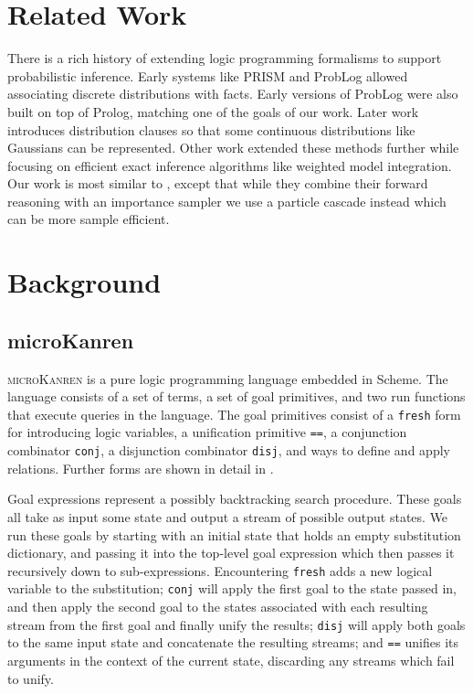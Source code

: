 \documentclass[
]{ceurart}
\begin{document}
\section{Related Work}

There is a rich history of extending logic programming formalisms to
support probabilistic inference. Early systems like
PRISM\cite{sato1997prism} and ProbLog\cite{de2007problog} allowed
associating discrete distributions with facts. Early versions of
ProbLog were also built on top of Prolog, matching one of the goals of
our work. Later work\cite{gutmann2010extending} introduces
distribution clauses so that some continuous distributions like
Gaussians can be represented. Other work extended these methods
further while focusing on efficient exact inference algorithms like
weighted model integration\cite{islam2012inference,
  belle2015probabilistic}. Our work is most similar to
\cite{gutmann2011magic}, except that while they combine their forward
reasoning with an importance sampler we use a particle cascade instead
which can be more sample efficient.

\section{Background}

\subsection{microKanren}

\textsc{microKanren}\cite{10.1145/2989225.2989230, daniel2018reasoned}
is a pure logic programming language embedded in Scheme. The language
consists of a set of terms, a set of goal primitives, and two run
functions that execute queries in the language. The goal primitives
consist of a \texttt{fresh} form for introducing logic variables, a
unification primitive \texttt{==}, a conjunction combinator
\texttt{conj}, a disjunction combinator \texttt{disj}, and ways to
define and apply relations. Further forms are shown in detail in
.

Goal expressions represent a possibly backtracking search
procedure. These goals all take as input some state and output a
stream of possible output states. We run these goals by starting with
an initial state that holds an empty substitution dictionary, and
passing it into the top-level goal expression which then passes it
recursively down to sub-expressions. Encountering \texttt{fresh} adds
a new logical variable to the substitution; \texttt{conj} will apply
the first goal to the state passed in, and then apply the second goal
to the states associated with each resulting stream from the first
goal and finally unify the results; \texttt{disj} will apply both
goals to the same input state and concatenate the resulting streams;
and \texttt{==} unifies its arguments in the context of the current
state, discarding any streams which fail to unify.
\end{document}
